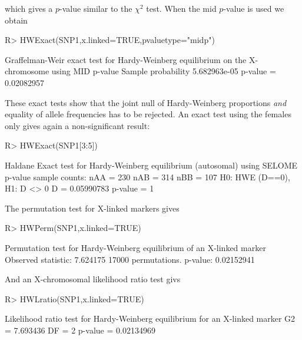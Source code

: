 \documentclass[nojss]{jss}
\begin{document}
which gives a $p$-value similar to the $\chi^2$ test. When the mid $p$-value is used we obtain

\begin{Schunk}
\begin{Sinput}
R> HWExact(SNP1,x.linked=TRUE,pvaluetype="midp")
\end{Sinput}
\begin{Soutput}
Graffelman-Weir exact test for Hardy-Weinberg equilibrium on the X-chromosome
using MID p-value
Sample probability 5.682963e-05 p-value =  0.02082957 
\end{Soutput}
\end{Schunk}

These exact tests show that the joint null of Hardy-Weinberg proportions \emph{and} equality of allele frequencies has to be rejected.
An exact test using the females only gives again a non-significant result:

\begin{Schunk}
\begin{Sinput}
R> HWExact(SNP1[3:5])
\end{Sinput}
\begin{Soutput}
Haldane Exact test for Hardy-Weinberg equilibrium (autosomal)
using SELOME p-value
sample counts: nAA =  230 nAB =  314 nBB =  107 
H0: HWE (D==0), H1: D <> 0 
D =  0.05990783 p-value =  1 
\end{Soutput}
\end{Schunk}

The permutation test for X-linked markers gives

\begin{Schunk}
\begin{Sinput}
R> HWPerm(SNP1,x.linked=TRUE)
\end{Sinput}
\begin{Soutput}
Permutation test for Hardy-Weinberg equilibrium of an X-linked marker
Observed statistic: 7.624175   17000 permutations. p-value: 0.02152941 
\end{Soutput}
\end{Schunk}

And an X-chromosomal likelihood ratio test givs

\begin{Schunk}
\begin{Sinput}
R> HWLratio(SNP1,x.linked=TRUE)
\end{Sinput}
\begin{Soutput}
Likelihood ratio test for Hardy-Weinberg equilibrium for an X-linked marker
G2 = 7.693436 DF = 2 p-value = 0.02134969 
\end{Soutput}
\end{Schunk}
\end{document}
